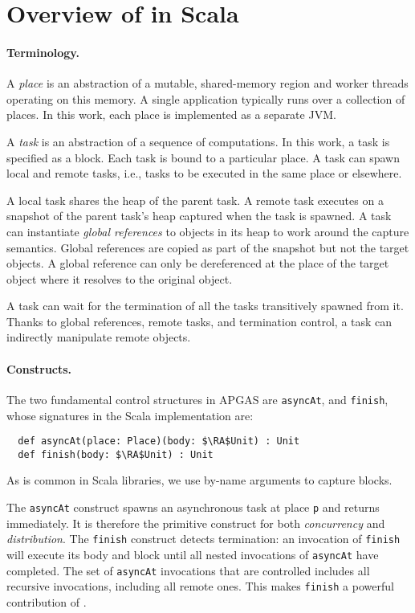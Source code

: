 \section{Overview of \apgas in Scala}
\label{sec:apgas}

\paragraph{Terminology.}
A {\em place} is an abstraction of a mutable, shared-memory region and worker threads operating on this memory.
A single application typically runs over a collection of places. In this work, each place is implemented as a separate JVM.

A {\em task} is an abstraction of a sequence of computations. In this work, a task is specified as a block.
Each task is bound to a particular place. 
A task can spawn local and remote tasks, i.e., tasks to be executed in the same place or elsewhere.

A local task shares the heap of the parent task. A remote task executes on a snapshot of the parent task's heap captured when the task is spawned. A task can instantiate \emph{global references} to objects in its heap to work around the capture semantics.
Global references are copied as part of the snapshot but not the target objects. A global reference can only be dereferenced
at the place of the target object where it resolves to the original object.

A task can wait for the termination of all the tasks transitively spawned from it.
Thanks to global references, remote tasks, and termination control,
a task can indirectly manipulate remote objects.

\paragraph{Constructs.}
The two fundamental control structures in APGAS are
 \lstinline{asyncAt}, and \lstinline{finish}, whose signatures in
the Scala implementation are:
\begin{lstlisting}
  def asyncAt(place: Place)(body: $\RA$Unit) : Unit
  def finish(body: $\RA$Unit) : Unit
\end{lstlisting}
As is common in Scala libraries, we use by-name arguments to capture blocks.

The \lstinline{asyncAt} construct spawns an asynchronous task at place \lstinline{p} and returns
immediately. It is therefore the primitive construct for both \emph{concurrency} and \emph{distribution}.
The \lstinline{finish} construct detects termination: an invocation of
\lstinline{finish} will execute its body and block until all nested invocations
of \lstinline{asyncAt} have completed. The set of \lstinline{asyncAt} invocations
that are controlled includes all recursive invocations, including all remote
ones. This makes \lstinline{finish} a powerful contribution of \apgas.

